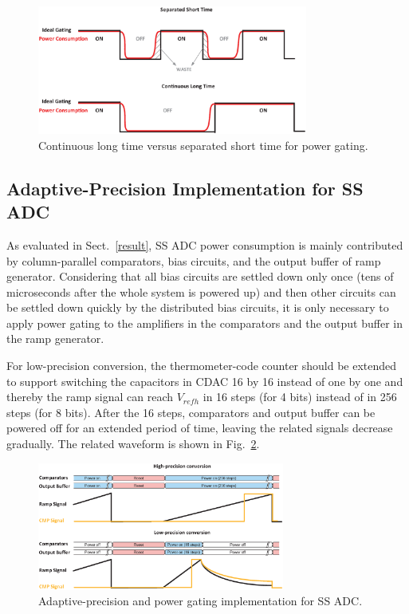 \begin{figure}[htbp]
	\centerline{\includegraphics[width=3.5in]{./Figures/TIME.eps}}
	\caption{Continuous long time versus separated short time for power gating.}
	\label{TIME}
\end{figure}  

\subsection{Adaptive-Precision Implementation for SS ADC}\label{gating2}

As evaluated in Sect.~\ref{result}, SS ADC power consumption is mainly contributed by column-parallel comparators, bias circuits, and the output buffer of ramp generator. 
Considering that all bias circuits are settled down only once (tens of microseconds after the whole system is powered up) and then other circuits can be settled down quickly by the distributed 
bias circuits, it is only necessary to apply power gating to the amplifiers in the comparators and the output buffer in the ramp generator.

For low-precision conversion, the thermometer-code counter should be extended to support switching the capacitors in CDAC 16 by 16 instead of one by one and thereby the ramp signal can reach $V_{refh}$ in 16 steps (for 4 bits) instead of in 256 steps (for 8 bits). 
After the 16 steps, comparators and output buffer can be powered off for an extended period of time, leaving the related signals decrease gradually.
The related waveform is shown in Fig.~\ref{SS_pg}. 

\begin{figure}[htbp]
	\centerline{\includegraphics[width=3.2in]{./Figures/SS_pg.eps}}
	\caption{Adaptive-precision and power gating implementation for SS ADC.}
	\label{SS_pg}
\end{figure} 

